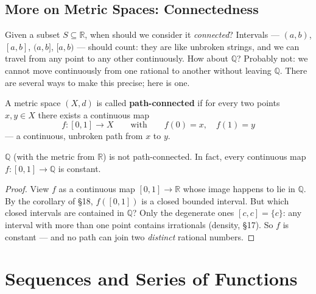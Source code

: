 \documentclass[11pt]{report}
\begin{document}

\section{More on Metric Spaces: Connectedness}

Given a subset $S \subseteq \mathbb{R}$, when should we consider it \emph{connected}? Intervals --- $(a,b)$, $[a,b]$, $(a,b]$, $[a,b)$ --- should count: they are like unbroken strings, and we can travel from any point to any other continuously. How about $\mathbb{Q}$? Probably not: we cannot move continuously from one rational to another without leaving $\mathbb{Q}$. There are several ways to make this precise; here is one.

\begin{defbox}
A metric space $(X,d)$ is called \textbf{path-connected} if for every two points $x, y \in X$ there exists a continuous map
\[
f: [0,1] \to X \qquad \text{with} \qquad f(0) = x, \quad f(1) = y
\]
--- a continuous, unbroken path from $x$ to $y$.
\end{defbox}

\begin{propbox}
$\mathbb{Q}$ (with the metric from $\mathbb{R}$) is not path-connected. In fact, every continuous map $f: [0,1] \to \mathbb{Q}$ is constant.
\end{propbox}

\begin{proof}
View $f$ as a continuous map $[0,1] \to \mathbb{R}$ whose image happens to lie in $\mathbb{Q}$. By the corollary of \S 18, $f([0,1])$ is a closed bounded interval. But which closed intervals are contained in $\mathbb{Q}$? Only the degenerate ones $[c,c] = \{c\}$: any interval with more than one point contains irrationals (density, \S 17). So $f$ is constant --- and no path can join two \emph{distinct} rational numbers.
\end{proof}


\chapter{Sequences and Series of Functions}
\end{document}

